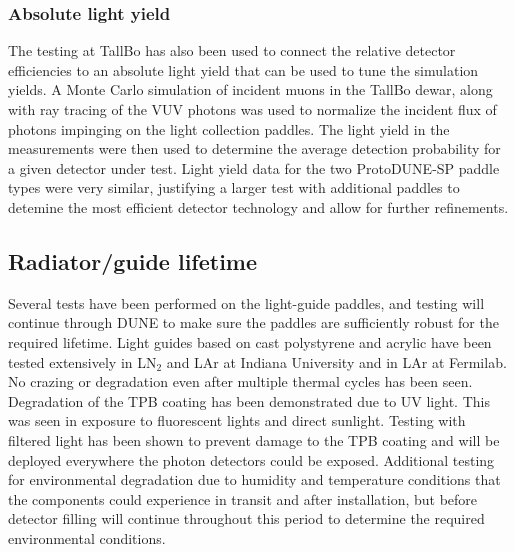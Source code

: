 \subsubsection{Absolute light yield}
The testing at TallBo has also been used to connect the relative detector
efficiencies to an absolute light yield that can be used to tune the simulation
yields.  
A Monte Carlo simulation of incident muons in the TallBo dewar, along with ray tracing
of the VUV photons was used to normalize the incident flux of photons impinging on the
light collection paddles.  
The light yield in the measurements were then used to determine the average detection 
probability for a given detector under test.
Light yield data for the two ProtoDUNE-SP paddle types were very similar, justifying
a larger test with additional paddles to detemine the most efficient detector 
technology and allow for further refinements.

\subsection{Radiator/guide lifetime}
Several tests have been performed on the light-guide paddles, and testing will 
continue through DUNE to make sure the paddles are sufficiently robust for the
required lifetime.
Light guides based on cast polystyrene and acrylic have been tested 
extensively in LN$_2$ and LAr at Indiana University and in LAr at Fermilab.
No crazing or degradation even after multiple thermal cycles has been seen.
Degradation of the TPB coating has been demonstrated due to UV light.
This was seen in exposure to fluorescent lights and direct sunlight.
Testing with filtered light %
has been shown to prevent damage
to the TPB coating and will be deployed everywhere the photon detectors
could be exposed.
Additional testing for environmental degradation due to humidity and 
temperature conditions that the components could experience in transit and 
after installation, but before detector filling will continue throughout this
period to determine the required environmental conditions.


